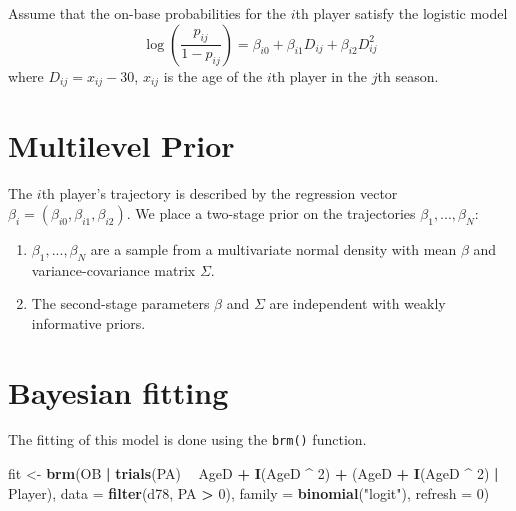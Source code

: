 \documentclass[
]{book}
\newenvironment{Shaded}{\begin{snugshade}}{\end{snugshade}}
\newcommand{\DataTypeTok}[1]{\textcolor[rgb]{0.13,0.29,0.53}{#1}}
\newcommand{\DecValTok}[1]{\textcolor[rgb]{0.00,0.00,0.81}{#1}}
\newcommand{\KeywordTok}[1]{\textcolor[rgb]{0.13,0.29,0.53}{\textbf{#1}}}
\newcommand{\NormalTok}[1]{#1}
\newcommand{\OperatorTok}[1]{\textcolor[rgb]{0.81,0.36,0.00}{\textbf{#1}}}
\newcommand{\StringTok}[1]{\textcolor[rgb]{0.31,0.60,0.02}{#1}}
\begin{document}
Assume that the on-base probabilities for the \(i\)th player satisfy the logistic model
\[
\log \left(\frac{p_{ij}}{1 - p_{ij}}\right) = \beta_{i0} + \beta_{i1} D_{ij} + \beta_{i2} D_{ij}^2
\]
where \(D_{ij} = x_{ij} - 30\), \(x_{ij}\) is the age of the \(i\)th player in the \(j\)th season.

\hypertarget{multilevel-prior}{%
\section{Multilevel Prior}\label{multilevel-prior}}

The \(i\)th player's trajectory is described by the regression vector \(\beta_i = (\beta_{i0}, \beta_{i1}, \beta_{i2})\). We place a two-stage prior on the trajectories \(\beta_1, ..., \beta_N\):

\begin{enumerate}
\def\labelenumi{\arabic{enumi}.}
\item
  \(\beta_1, ..., \beta_N\) are a sample from a multivariate normal density with mean \(\beta\) and variance-covariance matrix \(\Sigma\).
\item
  The second-stage parameters \(\beta\) and \(\Sigma\) are independent with weakly informative priors.
\end{enumerate}

\hypertarget{bayesian-fitting}{%
\section{Bayesian fitting}\label{bayesian-fitting}}

The fitting of this model is done using the \texttt{brm()} function.

\begin{Shaded}
\begin{Highlighting}[]
\NormalTok{fit <-}\StringTok{ }\KeywordTok{brm}\NormalTok{(OB }\OperatorTok{|}\StringTok{ }\KeywordTok{trials}\NormalTok{(PA) }\OperatorTok{~}\StringTok{ }\NormalTok{AgeD }\OperatorTok{+}\StringTok{ }\KeywordTok{I}\NormalTok{(AgeD }\OperatorTok{^}\StringTok{ }\DecValTok{2}\NormalTok{) }\OperatorTok{+}
\StringTok{             }\NormalTok{(AgeD }\OperatorTok{+}\StringTok{ }\KeywordTok{I}\NormalTok{(AgeD }\OperatorTok{^}\StringTok{  }\DecValTok{2}\NormalTok{) }\OperatorTok{|}\StringTok{ }\NormalTok{Player),}
           \DataTypeTok{data =} \KeywordTok{filter}\NormalTok{(d78, PA }\OperatorTok{>}\StringTok{ }\DecValTok{0}\NormalTok{),}
           \DataTypeTok{family =} \KeywordTok{binomial}\NormalTok{(}\StringTok{"logit"}\NormalTok{),}
           \DataTypeTok{refresh =} \DecValTok{0}\NormalTok{)}
\end{Highlighting}
\end{Shaded}
\end{document}
